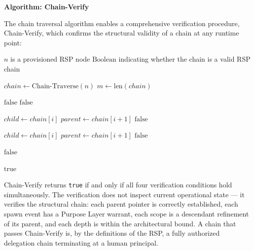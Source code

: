 \medskip
\noindent\textbf{Algorithm: Chain-Verify}

The chain traversal algorithm enables a comprehensive verification procedure, Chain-Verify, which confirms the structural validity of a chain at any runtime point:

\begin{algorithm}
\caption{Chain-Verify($n$) --- Verify the authorization chain from node $n$ to human anchor}
\label{alg:chain-verify}
\begin{algorithmic}[1]
\REQUIRE $n$ is a provisioned RSP node
\ENSURE $\text{Boolean}$ indicating whether the chain is a valid RSP chain

\STATE $chain \leftarrow \text{Chain-Traverse}(n)$
\STATE $m \leftarrow \text{len}(chain)$

\STATE {}
    \STATE \RETURN $\text{false}$ 
\ENDIF
{}
    \STATE \RETURN $\text{false}$ 
\ENDIF

\STATE {}
    \STATE $child \leftarrow chain[i]$
    \STATE $parent \leftarrow chain[i+1]$
        \STATE \RETURN $\text{false}$ 
    \ENDIF
\ENDFOR

\STATE {}
    \STATE $child \leftarrow chain[i]$
    \STATE $parent \leftarrow chain[i+1]$
        \STATE \RETURN $\text{false}$ 
    \ENDIF
\ENDFOR

\STATE {}
        \STATE \RETURN $\text{false}$ 
    \ENDIF
\ENDFOR

\RETURN $\text{true}$
\end{algorithmic}
\end{algorithm}

Chain-Verify returns \texttt{true} if and only if all four verification conditions hold simultaneously. The verification does not inspect current operational state --- it verifies the structural chain: each parent pointer is correctly established, each spawn event has a Purpose Layer warrant, each scope is a descendant refinement of its parent, and each depth is within the architectural bound. A chain that passes Chain-Verify is, by the definitions of the RSP, a fully authorized delegation chain terminating at a human principal.

